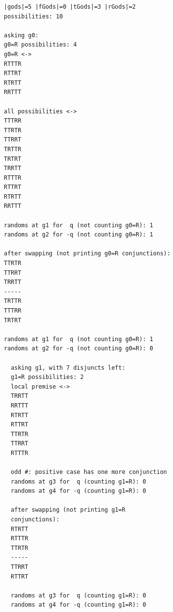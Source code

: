\documentclass[twoside,twocolumn,a4paper,11pt]{article}
\theoremstyle{definition}
\begin{document}
\begin{verbatim}
|gods|=5 |fGods|=0 |tGods|=3 |rGods|=2 
possibilities: 10

asking g0:
g0=R possibilities: 4
g0=R <->
RTTTR
RTTRT
RTRTT
RRTTT

all possibilities <->
TTTRR
TTRTR
TTRRT
TRTTR
TRTRT
TRRTT
RTTTR
RTTRT
RTRTT
RRTTT

randoms at g1 for  q (not counting g0=R): 1
randoms at g2 for -q (not counting g0=R): 1

after swapping (not printing g0=R conjunctions):
TTRTR
TTRRT
TRRTT
-----
TRTTR
TTTRR
TRTRT

randoms at g1 for  q (not counting g0=R): 1
randoms at g2 for -q (not counting g0=R): 0

  asking g1, with 7 disjuncts left:
  g1=R possibilities: 2
  local premise <->
  TRRTT
  RRTTT
  RTRTT
  RTTRT
  TTRTR
  TTRRT
  RTTTR
  
  odd #: positive case has one more conjunction
  randoms at g3 for  q (counting g1=R): 0
  randoms at g4 for -q (counting g1=R): 0

  after swapping (not printing g1=R 
  conjunctions):
  RTRTT
  RTTTR
  TTRTR
  -----
  TTRRT
  RTTRT
  
  randoms at g3 for  q (counting g1=R): 0
  randoms at g4 for -q (counting g1=R): 0
\end{verbatim}
\vspace{-22pt}
\end{document}
